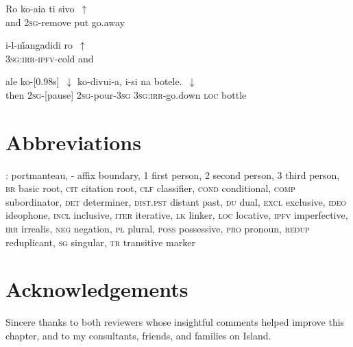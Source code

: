 \documentclass[output=paper]{LSP/langsci}
\begin{document}
  \begin{exe}
\ex \label{Guapp25}
\gll     Ro     ko-aia         ti    sivo~$\uparrow$    \\     	       
 and   \textsc{2sg}-remove   put   go.away \\
\glt {} 
\end{exe}

  \begin{exe}
\ex \label{Guapp26}
\gll    i-l-\H{m}angadidi               ro~$\uparrow$  \\     	       
 \textsc{3sg:irr-ipfv}-cold        and\\
\glt {} 
\end{exe}

  \begin{exe}
\ex \label{Guapp27}
\gll   ale    ko-[0.98s]~$\downarrow$      ko-divui-a,  i-si                 na   botele.~$\downarrow$  \\     	       
 then   \textsc{2sg}-[pause]      \textsc{2sg}-pour-\textsc{3sg}  \textsc{3sg:irr}-go.down   \textsc{loc}  bottle\\
\glt {} 
\end{exe}



\section*{Abbreviations}
\textsc{:} portmanteau,
\textsc{-} affix boundary,
\textsc{1}		first person,
\textsc{2}		second person,
\textsc{3} 		third person,
\textsc{br}		basic root,
\textsc{cit}		citation root,
\textsc{clf}		classifier,
\textsc{cond}		conditional,
\textsc{comp}		subordinator,
\textsc{det}		determiner,
\textsc{dist.pst}		distant past,
\textsc{du}		dual,
\textsc{excl}		exclusive,
\textsc{ideo}		ideophone,
\textsc{incl}		inclusive,
\textsc{iter}		iterative,
\textsc{lk}		linker,
\textsc{loc}		locative,
\textsc{ipfv}		imperfective,
\textsc{irr} 		irrealis,
\textsc{neg} 		negation,
\textsc{pl} 		plural,
\textsc{poss} 		possessive,
\textsc{pro} 		pronoun,
\textsc{redup} 		reduplicant,
\textsc{sg} 		singular,
\textsc{tr} 		transitive marker




\section*{Acknowledgements}
Sincere thanks to both reviewers whose insightful comments helped improve this chapter, and to my consultants, friends, and families on  Island.

\printbibliography[heading=subbibliography,notkeyword=this] 
\end{document}
